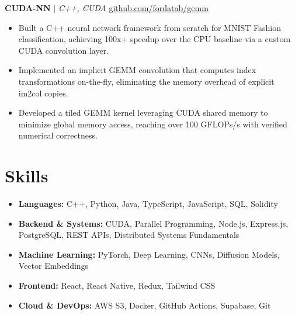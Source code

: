 \documentclass[11pt]{article}
\begin{document}
\textbf{CUDA-NN} $|$ \emph{C++, CUDA} \hfill \href{https://github.com/fordatab/gemm}{github.com/fordatab/gemm}
\vspace{-2pt}
\begin{itemize}
    \item Built a C++ neural network framework from scratch for MNIST Fashion classification, achieving 100x+ speedup over the CPU baseline via a custom CUDA convolution layer.
    \item Implemented an implicit GEMM convolution that computes index transformations on-the-fly, eliminating the memory overhead of explicit im2col copies.
    \item Developed a tiled GEMM kernel leveraging CUDA shared memory to minimize global memory access, reaching over 100 GFLOPs/s with verified numerical correctness.
\end{itemize}


\vspace{-12pt}

\section*{Skills}
\begin{itemize}[leftmargin=*, nosep, itemsep=2pt]
    \item \textbf{Languages:} C++, Python, Java, TypeScript, JavaScript, SQL, Solidity
    \item \textbf{Backend \& Systems:} CUDA, Parallel Programming, Node.js, Express.js, PostgreSQL, REST APIs, Distributed Systems Fundamentals
    \item \textbf{Machine Learning:} PyTorch, Deep Learning, CNNs, Diffusion Models, Vector Embeddings
    \item \textbf{Frontend:} React, React Native, Redux, Tailwind CSS
    \item \textbf{Cloud \& DevOps:} AWS S3, Docker, GitHub Actions, Supabase, Git
\end{itemize}
\end{document}
